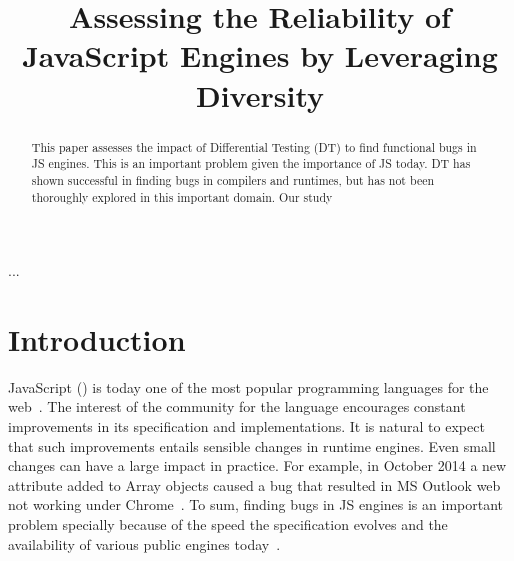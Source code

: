 \documentclass[10pt,conference,anonymous]{IEEEtran}
\begin{document}
\title{Assessing the Reliability of JavaScript Engines by Leveraging Diversity}


\maketitle

\thispagestyle{plain}
\pagestyle{plain}

\begin{abstract}
This paper assesses the impact of Differential Testing (DT) to find
functional bugs in JS engines. This is an important problem given the
importance of JS today. DT has shown successful in finding bugs in
compilers and runtimes, but has not been thoroughly explored in this
important domain. Our study 
\end{abstract}

\begin{IEEEkeywords}
...
\end{IEEEkeywords}

\section{Introduction}

JavaScript (\js{}) is today one of the most popular programming
languages for the web~\cite{business-insider,stackify}. The interest
of the community for the language encourages constant improvements in
its specification and implementations. It is natural to expect that
such improvements entails sensible changes in runtime engines. Even
small changes can have a large impact in practice. For example, in
October 2014 a new attribute added to Array objects caused a bug that
resulted in MS Outlook web not working under
Chrome~\cite{array-bug-chromium-issue4247,array-bug-discussion}. To
sum, finding bugs in JS engines is an important problem specially
because of the speed the specification evolves and the availability of
various public engines today~\cite{kangax}.
\end{document}
